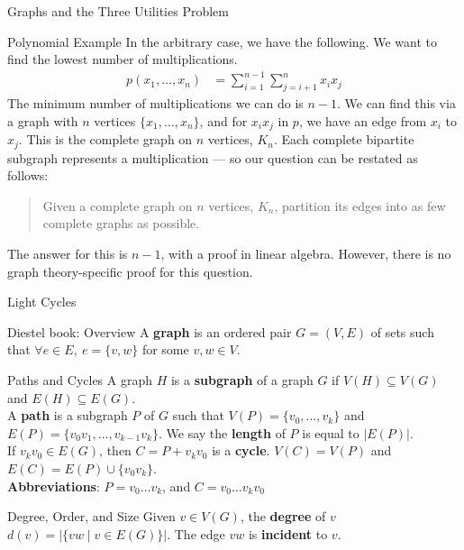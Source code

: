 \documentclass[10pt]{extarticle}
\begin{document}
{\begin{problem}{Graphs and the Three Utilities Problem}
\begin{problem}{Polynomial Example}
      In the arbitrary case, we have the following. We want to find the lowest number of multiplications.
      \begin{align*}
        p(x_1,\dots,x_n) &= \sum_{i = 1}^{n-1}\sum_{j = i+1}^{n} x_ix_j
      \end{align*}
      \tcblower
      The minimum number of multiplications we can do is $n-1$. We can find this via a graph with $n$ vertices $\{x_1,\dots,x_n\}$, and for $x_ix_j$ in $p$, we have an edge from $x_i$ to $x_j$. This is the complete graph on $n$ vertices, $K_n$. Each complete bipartite subgraph represents a multiplication — so our question can be restated as follows:
      \begin{quote}
          Given a complete graph on $n$ vertices, $K_n$, partition its edges into as few complete graphs as possible.
      \end{quote}
      The answer for this is $n-1$, with a proof in linear algebra. However, there is no graph theory-specific proof for this question.
    \end{problem}
  \end{problem}
  \begin{problem}{Light Cycles}
    \begin{tcbraster}[raster columns = 1,colframe = black!75!white,colback=white]
    \end{tcbraster}
  \end{problem}
  \begin{problem}{Diestel book: Overview}
    A \textbf{graph} is an ordered pair $G = (V,E)$ of sets such that $\forall e\in E,~e=\{v,w\}$ for some $v,w\in V$.
    \begin{problem}{Paths and Cycles}
      A graph $H$ is a \textbf{subgraph} of a graph $G$ if $V(H) \subseteq V(G)$ and $E(H) \subseteq E(G)$. \\

      A \textbf{path} is a subgraph $P$ of $G$ such that $V(P) = \{v_0,\dots,v_k\}$ and $E(P) = \{v_0v_1,\dots,v_{k-1}v_k\}$. We say the \textbf{length} of $P$ is equal to $|E(P)|$.\\

      If $v_kv_0\in E(G)$, then $C = P + v_kv_0$ is a \textbf{cycle}. $V(C) = V(P)$ and $E(C) = E(P) \cup \{v_0v_k\}$.\\

      \textbf{Abbreviations}: $P = v_0\dots v_k$, and $C = v_0\dots v_kv_0$
    \end{problem}
    \begin{problem}{Degree, Order, and Size}
      Given $v\in V(G)$, the \textbf{degree} of $v$ $d(v) = |\{vw \mid v\in E(G)\}|$. The edge $vw$ is \textbf{incident} to $v$.\\


\end{problem}
\end{problem}}
\end{document}
